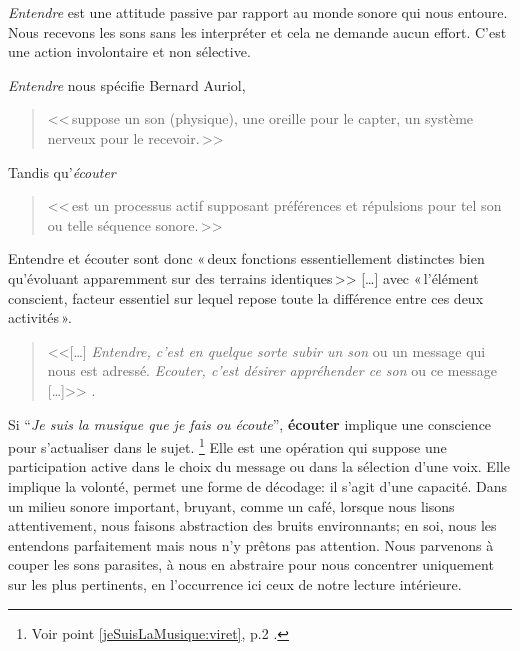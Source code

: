 \emph{Entendre} est une attitude passive par rapport au monde sonore
qui nous entoure. Nous recevons les sons sans les interpréter et cela
ne demande aucun effort. C'est une action involontaire et non
sélective.

\textit{Entendre} nous spécifie Bernard Auriol, \autocite[p. 2, ch . 1]{auriol:cle}
\begin{quote}
	<<\,suppose un son (physique), une oreille
	pour le capter, un système nerveux pour le recevoir.\,>>
\end{quote} 
Tandis qu'\textit{écouter} 
\begin{quote}
	<<\,est un
	processus actif supposant préférences et répulsions pour tel son ou
	telle séquence sonore.\,>>
\end{quote}


Entendre et écouter sont donc  «\,deux
fonctions essentiellement distinctes bien qu'évoluant apparemment sur
des terrains identiques\,>>
[\dots] avec «\,l'élément conscient, facteur essentiel sur lequel repose toute la
différence entre ces deux activités\,».\autocite[]{tomatis_oreille_1991}
\begin{quote}
	
	<<[\ldots] \emph{Entendre, c'est en quelque sorte subir
		un son} ou un message qui nous est adressé. \emph{Ecouter, c'est désirer appréhender ce son} ou ce message [\ldots]>>
	\autocite{tomatis:education}.	
\end{quote}



Si \enquote{\emph{Je suis la musique que je fais ou écoute}}\autocite{viret:b}, \textbf{écouter} implique 
une conscience pour s'actualiser dans le sujet. \footnote{Voir point
  \ref{jeSuisLaMusique:viret}, p.2 \pageref{jeSuisLaMusique:viret}.}
Elle est une opération 
qui suppose une participation active dans le choix du message
ou dans la sélection d'une voix. Elle  implique la volonté,
permet une forme de décodage: il s'agit d'une capacité.
Dans un milieu sonore important,
 bruyant, comme un café, lorsque nous lisons attentivement, nous faisons abstraction
des bruits environnants; en soi, nous les entendons parfaitement mais nous n'y
prêtons pas attention. Nous parvenons à couper les sons parasites, à nous en abstraire pour
nous concentrer uniquement sur les plus  pertinents, en l'occurrence
ici ceux de notre lecture intérieure.



